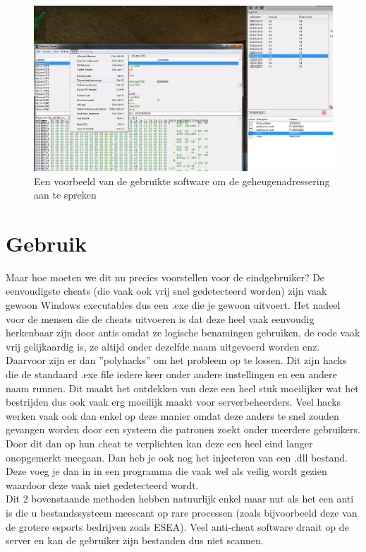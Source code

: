 \documentclass[pdftex,a4paper,12pt,twoside]{report}
\begin{document}
\begin{figure}[H]
\centering
\includegraphics[width=15cm]{img/aimhack-code-example}
\caption{Een voorbeeld van de gebruikte software om de geheugenadressering aan te spreken}
\end{figure}

\section{Gebruik}
\label{sec:gebruik}
Maar hoe moeten we dit nu precies voorstellen voor de eindgebruiker? De eenvoudigste \gls{cheat}s (die vaak ook vrij snel gedetecteerd worden) zijn vaak gewoon Windows executables dus een .exe die je gewoon uitvoert. Het nadeel voor de mensen die de \gls{cheat}s uitvoeren is dat deze heel vaak eenvoudig herkenbaar zijn door \gls{anti}s omdat ze logische benamingen gebruiken, de code vaak vrij gelijkaardig is, ze altijd onder dezelfde naam uitgevoerd worden enz.
\\

Daarvoor zijn er dan ''polyhacks'' om het probleem op te lossen. Dit zijn hacks die de standaard .exe file iedere keer onder andere instellingen en een andere naam runnen. Dit maakt het ontdekken van deze een heel stuk moeilijker wat het bestrijden dus ook vaak erg moeilijk maakt voor serverbeheerders. Veel hacks werken vaak ook dan enkel op deze manier omdat deze anders te snel zouden gevangen worden door een systeem die patronen zoekt onder meerdere gebruikers. Door dit dan op hun \gls{cheat} te verplichten kan deze een heel eind langer onopgemerkt meegaan.
\newpage
Dan heb je ook nog het injecteren van een .dll bestand. Deze voeg je dan in in een programma die vaak wel als veilig wordt gezien waardoor deze vaak niet gedetecteerd wordt. 
\\

Dit 2 bovenstaande methoden hebben natuurlijk enkel maar nut als het een \gls{anti} is die u bestandssysteem meescant op rare processen (zoals bijvoorbeeld deze van de grotere \gls{esports} bedrijven zoals ESEA). Veel anti-cheat software draait op de server en kan de gebruiker zijn bestanden dus niet scannen. \citep{esea}
\end{document}
